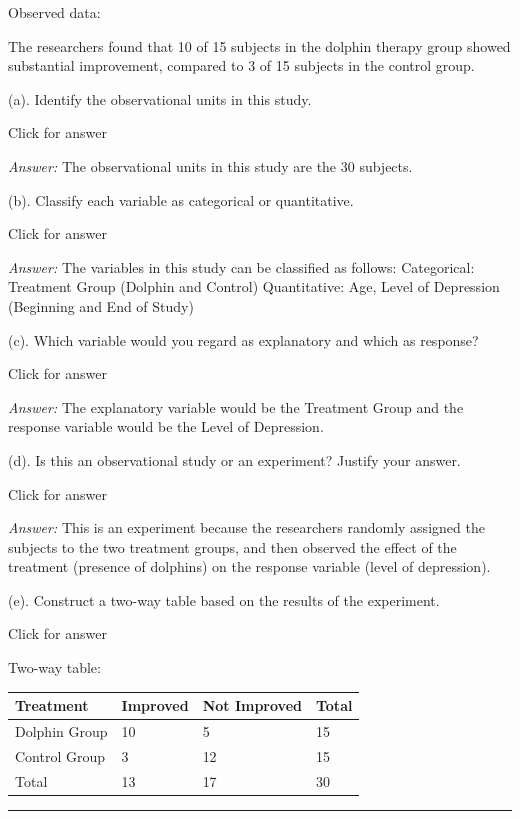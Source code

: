 \documentclass[
]{book}
\begin{document}
Observed data:

The researchers found that 10 of 15 subjects in the dolphin therapy group showed substantial improvement, compared to 3 of 15 subjects in the control group.

(a). Identify the observational units in this study.

Click for answer

\emph{Answer:} The observational units in this study are the 30 subjects.

(b). Classify each variable as categorical or quantitative.

Click for answer

\emph{Answer:} The variables in this study can be classified as follows:
Categorical: Treatment Group (Dolphin and Control)
Quantitative: Age, Level of Depression (Beginning and End of Study)

(c). Which variable would you regard as explanatory and which as response?

Click for answer

\emph{Answer:} The explanatory variable would be the Treatment Group and the response variable would be the Level of Depression.

(d). Is this an observational study or an experiment? Justify your answer.

Click for answer

\emph{Answer:} This is an experiment because the researchers randomly assigned the subjects to the two treatment groups, and then observed the effect of the treatment (presence of dolphins) on the response variable (level of depression).

(e). Construct a two-way table based on the results of the experiment.

Click for answer

Two-way table:

\begin{longtable}[]{@{}llll@{}}
\toprule()
Treatment & Improved & Not Improved & Total \\
\midrule()
\endhead
Dolphin Group & 10 & 5 & 15 \\
Control Group & 3 & 12 & 15 \\
Total & 13 & 17 & 30 \\
\bottomrule()
\end{longtable}

\begin{center}\rule{0.5\linewidth}{0.5pt}\end{center}
\end{document}
